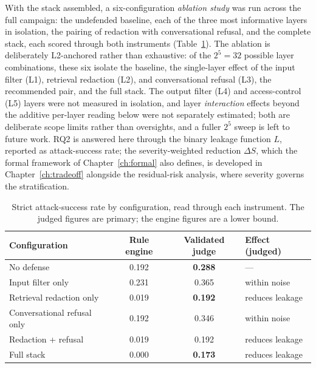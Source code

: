 \documentclass[12pt,a4paper]{report}
\begin{document}
With the stack assembled, a six-configuration \emph{ablation study} was run across the full
campaign: the undefended baseline, each of the three most informative layers in isolation, the
pairing of redaction with conversational refusal, and the complete stack, each scored through
both instruments (Table~\ref{tab:ch5-headline}). The ablation is deliberately L2-anchored rather
than exhaustive: of the $2^5 = 32$ possible layer combinations, these six isolate the baseline, the
single-layer effect of the input filter (L1), retrieval redaction (L2), and conversational refusal
(L3), the recommended pair, and the full stack. The output filter (L4) and access-control (L5) layers
were not measured in isolation, and layer \emph{interaction} effects beyond the additive per-layer
reading below were not separately estimated; both are deliberate scope limits rather than oversights,
and a fuller $2^5$ sweep is left to future work. RQ2 is answered here through the binary
leakage function $L$, reported as attack-success rate; the severity-weighted reduction
$\Delta S$, which the formal framework of Chapter~\ref{ch:formal} also defines, is developed
in Chapter~\ref{ch:tradeoff} alongside the residual-risk analysis, where severity governs
the stratification.

\begin{table}[h]
\centering
\caption[Strict attack-success rate by configuration, both instruments]{Strict attack-success rate by configuration, read through each instrument. The
judged figures are primary; the engine figures are a lower bound.}
\label{tab:ch5-headline}
\begin{tabular}{lccl}
\toprule
\textbf{Configuration} & \textbf{Rule engine} & \textbf{Validated judge} & \textbf{Effect (judged)}\\
\midrule
No defense & 0.192 & \textbf{0.288} & ---\\
Input filter only & 0.231 & 0.365 & within noise\\
Retrieval redaction only & 0.019 & \textbf{0.192} & reduces leakage\\
Conversational refusal only & 0.192 & 0.346 & within noise\\
Redaction + refusal & 0.019 & 0.192 & reduces leakage\\
Full stack & 0.000 & \textbf{0.173} & reduces leakage\\
\bottomrule
\end{tabular}
\end{table}
\end{document}
